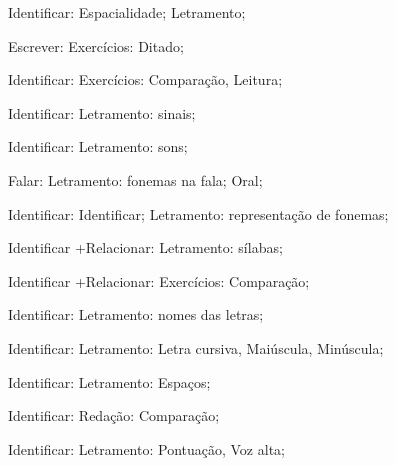 
 Identificar: Espacialidade; Letramento;

 Escrever: Exercícios: Ditado;

 Identificar: Exercícios: Comparação, Leitura;

 Identificar: Letramento: sinais;

 Identificar: Letramento: sons;

 Falar: Letramento: fonemas na fala; Oral;

 Identificar: Identificar; Letramento: representação de fonemas;

 Identificar +Relacionar: Letramento: sílabas; 

 Identificar +Relacionar: Exercícios: Comparação;

 Identificar: Letramento: nomes das letras;

 Identificar: Letramento: Letra cursiva, Maiúscula, Minúscula; 

 Identificar: Letramento: Espaços; 

 Identificar: Redação: Comparação;

 Identificar: Letramento: Pontuação, Voz alta;

